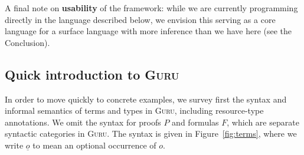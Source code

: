 \documentclass[9pt,natbib]{sigplanconf}
\begin{document}
A final note on \textbf{usability} of the framework: while we are
currently programming directly in the language described below, we
envision this serving as a core language for a surface language with
more inference than we have here (see the Conclusion).

\subsection{Quick introduction to \textsc{Guru}}
\label{sec:guru}

In order to move quickly to concrete examples, we survey first the
syntax and informal semantics of terms and types in \textsc{Guru},
including resource-type annotations.  We omit the syntax for proofs
$P$ and formulas $F$, which are separate syntactic categories in
\textsc{Guru}.  The syntax is given in Figure~\ref{fig:terms}, where
we write $\underline{o}$ to mean an optional occurrence of $o$.
\end{document}
